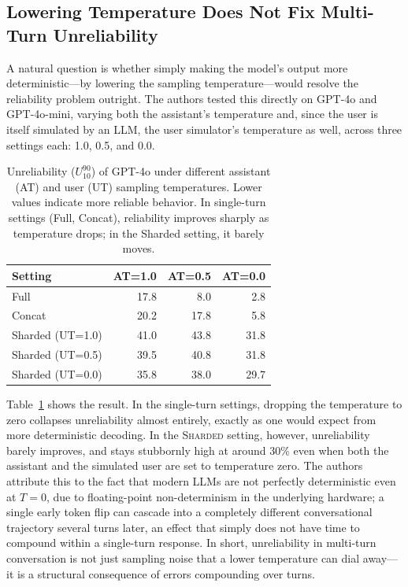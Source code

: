 \documentclass[manuscript,review]{acmart}
\begin{document}
\FloatBarrier

\subsection{Lowering Temperature Does Not Fix Multi-Turn Unreliability}

A natural question is whether simply making the model's output more deterministic---by
lowering the sampling temperature---would resolve the reliability problem outright. The
authors tested this directly on GPT-4o and GPT-4o-mini, varying both the assistant's
temperature and, since the user is itself simulated by an LLM, the user simulator's
temperature as well, across three settings each: 1.0, 0.5, and 0.0.

\begin{table}[htbp]
  \centering
  \caption{Unreliability ($U_{10}^{90}$) of GPT-4o under different assistant (AT) and user (UT) sampling temperatures. Lower values indicate more reliable behavior. In single-turn settings (Full, Concat), reliability improves sharply as temperature drops; in the Sharded setting, it barely moves.}
  \label{tab:temperature}
  \begin{tabular}{lrrr}
    \toprule
    \textbf{Setting} & \textbf{AT=1.0} & \textbf{AT=0.5} & \textbf{AT=0.0} \\
    \midrule
    Full           & 17.8 & 8.0  & 2.8 \\
    Concat         & 20.2 & 17.8 & 5.8 \\
    \midrule
    Sharded (UT=1.0) & 41.0 & 43.8 & 31.8 \\
    Sharded (UT=0.5) & 39.5 & 40.8 & 31.8 \\
    Sharded (UT=0.0) & 35.8 & 38.0 & 29.7 \\
    \bottomrule
  \end{tabular}
\end{table}

Table~\ref{tab:temperature} shows the result. In the single-turn settings, dropping the
temperature to zero collapses unreliability almost entirely, exactly as one would expect
from more deterministic decoding. In the \textsc{Sharded} setting, however, unreliability
barely improves, and stays stubbornly high at around 30\% even when both the assistant
and the simulated user are set to temperature zero. The authors attribute this to the fact
that modern LLMs are not perfectly deterministic even at $T=0$, due to floating-point
non-determinism in the underlying hardware; a single early token flip can cascade into a
completely different conversational trajectory several turns later, an effect that simply
does not have time to compound within a single-turn response. In short, unreliability in
multi-turn conversation is not just sampling noise that a lower temperature can dial away---it
is a structural consequence of errors compounding over turns.
\end{document}
